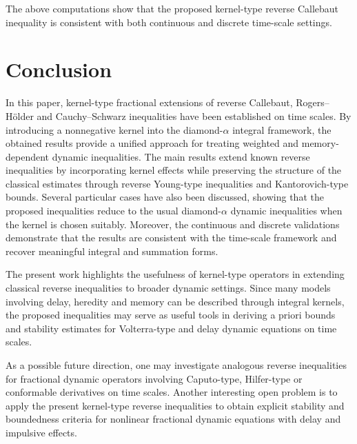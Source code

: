 \documentclass[11pt]{article}
\begin{document}
The above computations show that the proposed kernel-type reverse Callebaut
inequality is consistent with both continuous and discrete time-scale settings.


\section{Conclusion}

In this paper, kernel-type fractional extensions of reverse Callebaut, Rogers--H\"older and Cauchy--Schwarz inequalities have been established on time scales. By introducing a nonnegative kernel into the diamond-$\alpha$ integral framework, the obtained results provide a unified approach for treating weighted and memory-dependent dynamic inequalities. The main results extend known reverse inequalities by incorporating kernel effects while preserving the structure of the classical estimates through reverse Young-type inequalities and Kantorovich-type bounds. Several particular cases have also been discussed, showing that the proposed inequalities reduce to the usual diamond-$\alpha$ dynamic inequalities when the kernel is chosen suitably. Moreover, the continuous and discrete validations demonstrate that the results are consistent with the time-scale framework and recover meaningful integral and summation forms.

The present work highlights the usefulness of kernel-type operators in extending classical reverse inequalities to broader dynamic settings. Since many models involving delay, heredity and memory can be described through integral kernels, the proposed inequalities may serve as useful tools in deriving a priori bounds and stability estimates for Volterra-type and delay dynamic equations on time scales.

As a possible future direction, one may investigate analogous reverse inequalities for fractional dynamic operators involving Caputo-type, Hilfer-type or conformable derivatives on time scales. Another interesting open problem is to apply the present kernel-type reverse inequalities to obtain explicit stability and boundedness criteria for nonlinear fractional dynamic equations with delay and impulsive effects.
\end{document}
